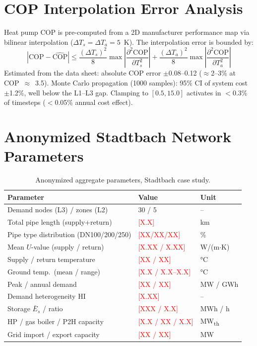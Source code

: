 \documentclass[review,3p]{elsarticle}
\newcommand{\placeholder}[1]{\textcolor{red}{[#1]}}
\begin{document}
\section{COP Interpolation Error Analysis}
\label{app:cop}

Heat pump COP is pre-computed from a 2D manufacturer performance map
via bilinear interpolation ($\Delta T_s = \Delta T_a = 5$~K). The
interpolation error is bounded by:
\begin{equation}
|\mathrm{COP} - \widehat{\mathrm{COP}}| \leq
\frac{(\Delta T_s)^2}{8}
\max \left|\frac{\partial^2 \mathrm{COP}}{\partial T_s^2}\right|
+ \frac{(\Delta T_a)^2}{8}
\max \left|\frac{\partial^2 \mathrm{COP}}{\partial T_a^2}\right|
\end{equation}
Estimated from the data sheet: absolute COP error $\pm$0.08--0.12
($\approx$2--3\% at COP~$\approx$~3.5). Monte Carlo propagation
(1000 samples): 95\% CI of system cost $\pm$1.2\%, well below the
L1--L3 gap. Clamping to $[0.5, 15.0]$ activates in $<$0.3\% of
timesteps ($<$0.05\% annual cost effect).

\section{Anonymized Stadtbach Network Parameters}
\label{app:stadtbach}

\begin{table}[htbp]
\centering
\caption{Anonymized aggregate parameters, Stadtbach case study.}
\label{tab:app_params}
\begin{tabular}{@{}lll@{}}
\toprule
Parameter & Value & Unit \\
\midrule
Demand nodes (L3) / zones (L2)        & 30 / 5                    & -- \\
Total pipe length (supply+return)      & \placeholder{X.X}         & km \\
Pipe type distribution (DN100/200/250) & \placeholder{XX/XX/XX}    & \% \\
Mean $U$-value (supply / return)       & \placeholder{X.XX / X.XX} & W/(m$\cdot$K) \\
Supply / return temperature            & \placeholder{XX / XX}     & \si{\celsius} \\
Ground temp.\ (mean / range)           & \placeholder{X.X / X.X--X.X} & \si{\celsius} \\
Peak / annual demand                   & \placeholder{XX / XX}     & MW / GWh \\
Demand heterogeneity HI                & \placeholder{X.XX}        & -- \\
Storage $\bar{E}_s$ / ratio            & \placeholder{XXX / X.X}   & MWh / h \\
HP / gas boiler / P2H capacity         & \placeholder{X.X / XX / X.X} & MW\textsubscript{th} \\
Grid import / export capacity          & \placeholder{XX / XX}     & MW \\
\bottomrule
\end{tabular}
\end{table}
\end{document}
